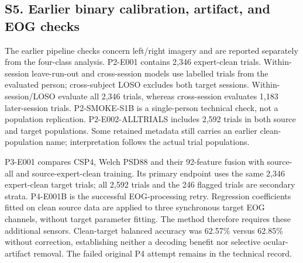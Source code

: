 \documentclass[11pt]{article}
\begin{document}
\subsection*{S5. Earlier binary calibration, artifact, and EOG checks}
The earlier pipeline checks concern left/right imagery and are reported separately from the four-class analysis. P2-E001 contains 2,346 expert-clean trials. Within-session leave-run-out and cross-session models use labelled trials from the evaluated person; cross-subject LOSO excludes both target sessions. Within-session/LOSO evaluate all 2,346 trials, whereas cross-session evaluates 1,183 later-session trials. P2-SMOKE-S1B is a single-person technical check, not a population replication. P2-E002-ALLTRIALS includes 2,592 trials in both source and target populations. Some retained metadata still carries an earlier clean-population name; interpretation follows the actual trial populations.

P3-E001 compares CSP4, Welch PSD88 and their 92-feature fusion with source-all and source-expert-clean training. Its primary endpoint uses the same 2,346 expert-clean target trials; all 2,592 trials and the 246 flagged trials are secondary strata. P4-E001B is the successful EOG-processing retry. Regression coefficients fitted on clean source data are applied to three synchronous target EOG channels, without target parameter fitting. The method therefore requires these additional sensors. Clean-target balanced accuracy was 62.57\% versus 62.85\% without correction, establishing neither a decoding benefit nor selective ocular-artifact removal. The failed original P4 attempt remains in the technical record.
\end{document}
